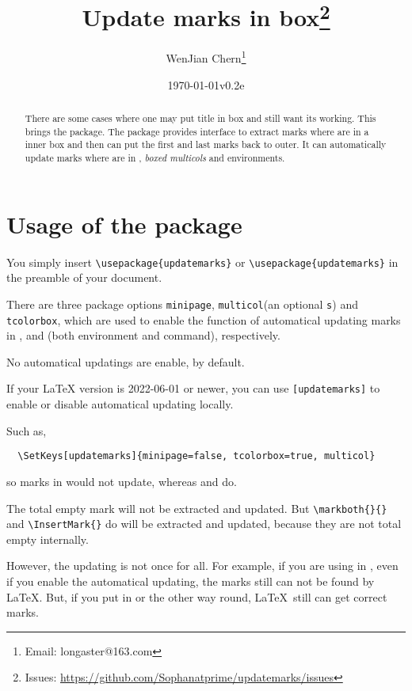 \documentclass{l3doc}
\title{Update marks in box\thanks{Issues: \url{https://github.com/Sophanatprime/updatemarks/issues}}}
\author{WenJian Chern\thanks{Email: longaster@163.com}}
\date{\today\qquad v0.2e}
\begin{document}
\maketitle

\begin{abstract}
There are some cases where one may put title in box and still want its 
 working. This brings the  package.
The  package provides interface to extract marks where are in a 
inner box and then can put the first and last marks back to outer.
It can automatically update marks where are in , 
\textit{boxed multicols} and  environments.
\end{abstract}


\tableofcontents


\section{Usage of the package}

You simply insert \verb|\usepackage{updatemarks}| or 
\verb|\usepackage|\verb|{updatemarks}| in the preamble of your document.

There are three package options \texttt{minipage}, 
\texttt{multicol}(an optional \texttt s) and 
\texttt{tcolorbox}, which are used to enable the function of automatical updating marks
in ,  and 
 (both  environment and  command), respectively.

No automatical updatings are enable, by default.

If your {\LaTeX} version is 2022-06-01 or newer, you can use 
\texttt{[updatemarks]} to enable or disable
automatical updating locally.

Such as,
\begin{verbatim}
  \SetKeys[updatemarks]{minipage=false, tcolorbox=true, multicol}
\end{verbatim}
so marks in  would not update, 
whereas  and  do.

The total empty mark will not be extracted and updated.
But \verb|\markboth{}{}| and \verb|\InsertMark{}| do will be extracted and updated,
because they are not total empty internally.

However, the updating is not once for all.
For example, if you are using  in , even if you enable
the automatical updating, the marks still can not be found by \LaTeX.
But, if you put  in  or the other way round, 
\LaTeX\ still can get correct marks.
\end{document}
